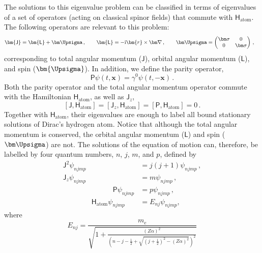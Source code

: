 \documentclass[letterpaper,12pt,titlepage,oneside,final]{book}
\newcommand{\mf}{\mathsf}%
\newcommand{\ii}{\mathrm{i}}
\begin{document}
The solutions to this eigenvalue problem can be classified in terms of eigenvalues of a set of operators (acting on classical spinor fields) that commute with $\mathsf{H}_\text{atom}$. The following operators are relevant to this problem: 
\begin{align}\label{Dirac-atom-operators}
    \bm{\mf{J}} &= \bm{\mf{L}} + {\bm \Upsigma}\,, \quad\quad {\bm{\mf{L}}} = - \ii \bm{r} \times \bm \nabla \, , \quad\quad {\bm \Upsigma} = \begin{pmatrix}
        \bm \sigma & 0 \\
        0 & \bm \sigma
    \end{pmatrix} \,,
\end{align}
corresponding to total angular momentum ($\bm{\mf{J}}$), orbital angular momentum ($\bm{\mf{L}}$), and spin ($\bm{\Upsigma}$). In addition, we define the parity operator,
\begin{equation}\label{Dirac-parity-operator}
    \mf{P}\psi(t, \bm{x}) = \gamma^0\psi(t, -\bm{x}) \, .
\end{equation} 
Both the parity operator and the total angular momentum operator commute with the Hamiltonian $\mf{H}_{\text{atom}}$, as well as $\mf{J}_z$,  
\begin{equation}\label{Dirac-atom-commute}
    [\bm{\mf{J}}, \mf{H}_{\text{atom}}] = [\mf{J}_z, \mf{H}_{\text{atom}}] = [\mf{P}, \mf{H}_{\text{atom}}] = 0 \,.
\end{equation}
Together with $\mf{H}_\text{atom}$, their eigenvalues are enough to label all bound stationary solutions of Dirac's hydrogen atom. Notice that
although the total angular momentum is conserved, the orbital angular momentum ($\bm{\mf{L}}$) and spin ($\bm \Upsigma$) are not. The solutions of the equation of motion can, therefore, be labelled by four quantum numbers, $n$, $j$, $m$, and $p$, defined by
\begin{align}
    \mf{J}^2\psi_{njmp} &= j(j+1)\psi_{njmp} \, , \\
    \mf{J}_z\psi_{njmp} &= m\psi_{njmp} \, ,  \\
    \quad\quad\quad\quad\quad\quad\quad\mf{P}\psi_{njmp} &= p\psi_{njmp} \, , \\ \quad\quad\quad\quad\mf{H}_{\text{atom}}\psi_{njmp} &= E_{nj}\psi_{njmp}\label{TIDE},
\end{align}
where 
\begin{equation}\label{Energies-dirac-atom}
    E_{nj} =\frac{m_e}{\sqrt{1+\frac{(Z \alpha)^2}{\left(n-j-\frac{1}{2}+\sqrt{\left(j+\frac{1}{2}\right)^2-(Z \alpha)^2}\right)^2}}}
\end{equation}
\end{document}
